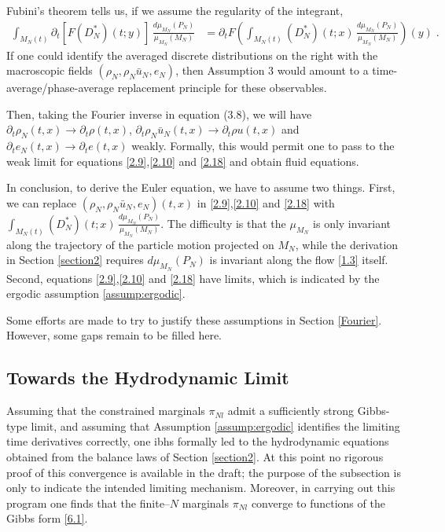 \documentclass[11pt]{article}
\begin{document}
Fubini's theorem tells us, if we assume the regularity of the integrant,
\begin{align*}
    \int_{M_N(t)}\partial_t[F(D^*_N)(t;y)]\,\frac{d\mu_{M_N}(P_N)}{\mu_{M_N}(M_N)}&=\partial_tF(\int_{M_N(t)}(D^*_N)(t;x)\,\frac{d\mu_{M_N}(P_N)}{\mu_{M_N}(M_N)})(y)\;.
\end{align*}
If one could identify the averaged discrete distributions on the right with the macroscopic fields $(\rho_N,\rho_N\bar{u}_N,e_N)$, then Assumption 3 would amount to a time-average/phase-average replacement principle for these observables.


Then, taking the Fourier inverse in equation (3.8), we will have $\partial_t\rho_N(t,x)\rightarrow\partial_t\rho(t,x)$, $\partial_t\rho_N\bar{u}_N(t,x)\rightarrow\partial_t\rho u(t,x)$ and $\partial_te_N(t,x)\rightarrow\partial_te(t,x)$ weakly. Formally, this would permit one to pass to the weak limit for equations \eqref{2.9},\eqref{2.10} and \eqref{2.18} and obtain fluid equations.


In conclusion, to derive the Euler equation, we have to assume two things. First, we can replace $(\rho_N,\rho_N\bar{u}_N,e_N)(t,x)$ in \eqref{2.9},\eqref{2.10} and \eqref{2.18} with $\int_{M_N(t)}(D^*_N)(t;x)\,\frac{d\mu_{M_N}(P_N)}{\mu_{M_N}(M_N)}$. The difficulty is that the $\mu_{M_N}$ is only invariant along the trajectory of the particle motion projected on $M_N$, while the derivation in Section \ref{section2} requires $d\mu_{M_N}(P_N)$ is invariant along the flow \eqref{1.3} itself. Second, equations  \eqref{2.9},\eqref{2.10} and \eqref{2.18} have limits, which is indicated by the ergodic assumption \ref{assump:ergodic}.

Some efforts are made to try to justify these assumptions in Section \ref{Fourier}. However, some gaps remain to be filled here.


\subsection{Towards the Hydrodynamic Limit}

Assuming that the constrained marginals $\pi_{Nl}$ admit a sufficiently strong Gibbs-type limit, and assuming that Assumption \ref{assump:ergodic} identifies the limiting time derivatives correctly, one ibhs formally led to the hydrodynamic equations obtained from the balance laws of Section \ref{section2}. At this point no rigorous proof of this convergence is available in the draft; the purpose of the subsection is only to indicate the intended limiting mechanism. Moreover, in carrying out this program one finds that the finite--$N$ marginals $\pi_{N l}$ converge to functions of the Gibbs form \eqref{6.1}.
\end{document}

